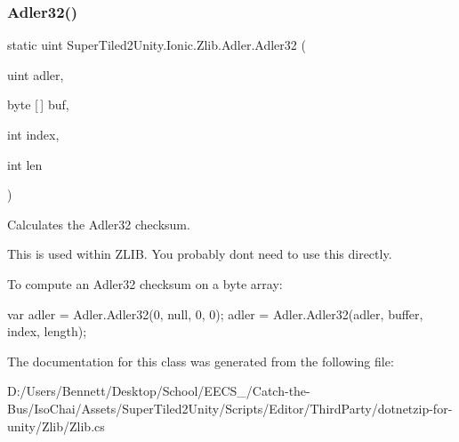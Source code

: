 \subsubsection{\texorpdfstring{Adler32()}{Adler32()}}
{\footnotesize\ttfamily static uint Super\+Tiled2\+Unity.\+Ionic.\+Zlib.\+Adler.\+Adler32 (\begin{DoxyParamCaption}\item[{uint}]{adler,  }\item[{byte \mbox{[}$\,$\mbox{]}}]{buf,  }\item[{int}]{index,  }\item[{int}]{len }\end{DoxyParamCaption})\hspace{0.3cm}{\ttfamily [static]}}



Calculates the Adler32 checksum. 

This is used within Z\+L\+IB. You probably don\textquotesingle{}t need to use this directly. 

To compute an Adler32 checksum on a byte array\+: 
\begin{DoxyCode}
var adler = Adler.Adler32(0, null, 0, 0);
adler = Adler.Adler32(adler, buffer, index, length);
\end{DoxyCode}
 

The documentation for this class was generated from the following file\+:\begin{DoxyCompactItemize}
\item 
D\+:/\+Users/\+Bennett/\+Desktop/\+School/\+E\+E\+C\+S\+\_/\+Catch-\/the-\/\+Bus/\+Iso\+Chai/\+Assets/\+Super\+Tiled2\+Unity/\+Scripts/\+Editor/\+Third\+Party/dotnetzip-\/for-\/unity/\+Zlib/Zlib.\+cs\end{DoxyCompactItemize}
